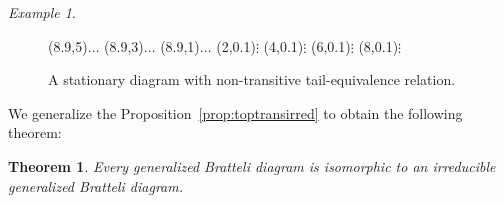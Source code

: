 \documentclass[11pt, twoside]{amsart}
\theoremstyle{definition}
\theoremstyle{remark}
\newtheorem{example}[definition]{Example}
\theoremstyle{plain}
\newtheorem{thm}[definition]{Theorem}
\numberwithin{equation}{section}
\begin{document}
\begin{example}
\begin{figure}
\begin{graph}
     
 

 

 
 


 
    \freetext(8.9,5){$\ldots$}
  \freetext(8.9,3){$\ldots$}
    \freetext(8.9,1){$\ldots$}
    \freetext(2,0.1){$\vdots$}
  \freetext(4,0.1){$\vdots$}
    \freetext(6,0.1){$\vdots$}
    \freetext(8,0.1){$\vdots$}
\end{graph}
\caption{A stationary diagram with non-transitive tail-equivalence relation.}\label{Fig:nontransitnonloccomp}
\end{figure}
\end{example}



We generalize the Proposition~\ref{prop:toptransirred} to obtain the following theorem:

\begin{thm}\label{thm:classII}
    Every generalized Bratteli diagram is isomorphic to an irreducible generalized Bratteli diagram. 
\end{thm}
\end{document}
